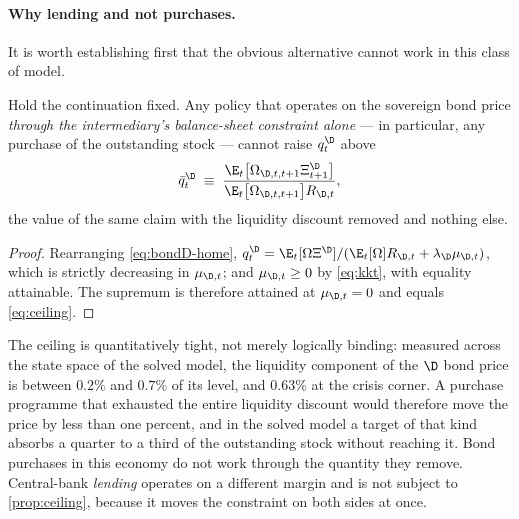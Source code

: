 \paragraph{Why lending and not purchases.} It is worth establishing first that
the obvious alternative cannot work in this class of model.

\begin{proposition}
\label{prop:ceiling}
Hold the continuation fixed. Any policy that operates on the sovereign bond price
\emph{through the intermediary's balance-sheet constraint alone} --- in
particular, any purchase of the outstanding stock --- cannot raise $q^{\D}_t$
above
\begin{equation}
\bar q^{\D}_t\;\equiv\;
\frac{\E_t\bigl[\Omega_{\D,t,t+1}\Xi^{\D}_{t+1}\bigr]}
     {\E_t\bigl[\Omega_{\D,t,t+1}\bigr]R_{\D,t}},
\label{eq:ceiling}
\end{equation}
the value of the same claim with the liquidity discount removed and nothing else.
\end{proposition}
\begin{proof}
Rearranging \eqref{eq:bondD-home}, $q^{\D}_t=\E_t[\Omega\Xi^{\D}]/(\E_t[\Omega]R_{\D,t}+\lambda_\D\mu_{\D,t})$,
which is strictly decreasing in $\mu_{\D,t}$; and $\mu_{\D,t}\ge0$ by
\eqref{eq:kkt}, with equality attainable. The supremum is therefore attained at
$\mu_{\D,t}=0$ and equals \eqref{eq:ceiling}.
\end{proof}

The ceiling is quantitatively tight, not merely logically binding: measured across
the state space of the solved model, the liquidity component of the $\D$ bond
price is between $0.2\%$ and $0.7\%$ of its level, and $0.63\%$ at the crisis
corner. A purchase programme that exhausted the entire liquidity discount would
therefore move the price by less than one percent, and in the solved model a
target of that kind absorbs a quarter to a third of the outstanding stock without
reaching it. Bond purchases in this economy do not work through the quantity they
remove. Central-bank \emph{lending} operates on a different margin and is not
subject to \cref{prop:ceiling}, because it moves the constraint on both sides at
once.

